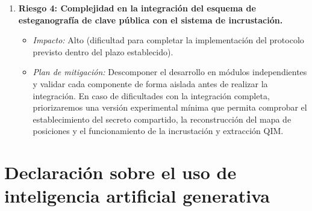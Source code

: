 \documentclass[IB]{TFUOC}%
\begin{document}
\begin{enumerate}
\item \textbf{Riesgo 4: Complejidad en la integración del esquema de esteganografía de clave pública con el sistema de incrustación.}
\begin{itemize}
    \item \textit{Impacto:} Alto (dificultad para completar la implementación del protocolo previsto dentro del plazo establecido).
    \item \textit{Plan de mitigación:} Descomponer el desarrollo en módulos independientes y validar cada componente de forma aislada antes de realizar la integración. En caso de dificultades con la integración completa, priorizaremos una versión experimental mínima que permita comprobar el establecimiento del secreto compartido, la reconstrucción del mapa de posiciones y el funcionamiento de la incrustación y extracción QIM.
\end{itemize}

\end{enumerate}







\section{Declaración sobre el uso de inteligencia artificial generativa}
\label{sec:declaracion_ia}
\end{document}
